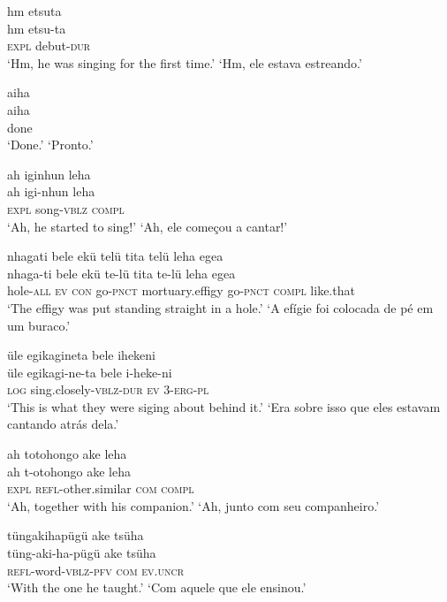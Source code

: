 \documentclass[output=paper,
modfonts,nonflat
]{langsci/langscibook}
\begin{document}
\ea  hm etsuta\\[.3em]
\gll hm etsu-ta\\
     \textsc{expl} debut-\textsc{dur}\\
\glt ‘Hm, he was singing for the first time.’
\glt ‘Hm, ele estava estreando.’
\z

\ea  aiha\\[.3em]
\gll aiha\\
     done\\
\glt ‘Done.’
\glt ‘Pronto.’
\z

\ea  ah iginhun leha\\[.3em]
\gll ah igi-nhun leha\\
     \textsc{expl} song-\textsc{vblz} \textsc{compl}\\
\glt ‘Ah, he started to sing!’
\glt ‘Ah, ele começou a cantar!’
\z

\ea  nhagati bele ekü telü tita telü leha egea\\[.3em]
\gll nhaga-ti bele ekü te-lü tita te-lü leha egea\\
     hole-\textsc{all} \textsc{ev} \textsc{con} go-\textsc{pnct} mortuary.effigy go-\textsc{pnct} \textsc{compl} like.that\\
\glt ‘The effigy was put standing straight in a hole.’
\glt ‘A efígie foi colocada de pé em um buraco.’
\z

\ea  üle egikagineta bele ihekeni\\[.3em]
\gll üle egikagi-ne-ta bele i-heke-ni\\
     \textsc{log} sing.closely-\textsc{vblz}-\textsc{dur} \textsc{ev} 3-\textsc{erg}-\textsc{pl}\\
\glt ‘This is what they were siging about behind it.’
\glt ‘Era sobre isso que eles estavam cantando atrás dela.’
\z

\ea  ah totohongo ake leha\\[.3em]
\gll ah t-otohongo ake leha\\
     \textsc{expl} \textsc{refl}-other.similar \textsc{com} \textsc{compl}\\
\glt ‘Ah, together with his companion.’
\glt ‘Ah, junto com seu companheiro.’
\z

\ea  tüngakihapügü ake tsüha\\[.3em]
\gll tüng-aki-ha-pügü ake tsüha\\
     \textsc{refl}-word-\textsc{vblz}-\textsc{pfv} \textsc{com} \textsc{ev.uncr}\\
\glt ‘With the one he taught.’
\glt ‘Com aquele que ele ensinou.’
\z
\end{document}
